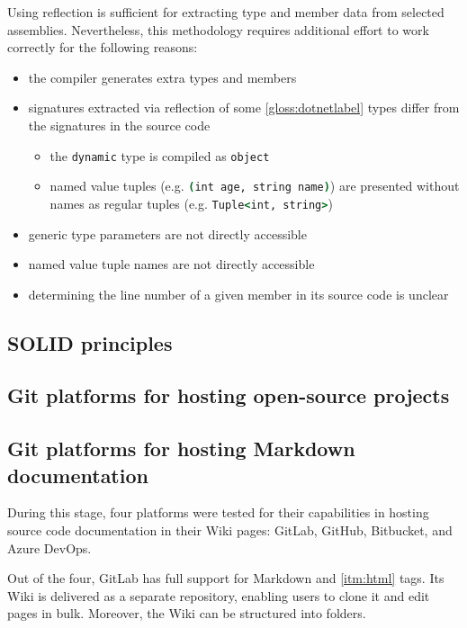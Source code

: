 Using reflection is sufficient for extracting type and member data from selected assemblies. Nevertheless, this methodology requires additional effort to work correctly for the following reasons:
\begin{itemize}
    \item the compiler generates extra types and members
    \item signatures extracted via reflection of some \ref{gloss:dotnetlabel} types differ from the signatures in the source code
    \begin{itemize}
        \item the \lstinline[language=csh]{dynamic} type is compiled as \lstinline[language=csh]{object}
        \item named value tuples (e.g. \lstinline[language=csh]{(int age, string name)}) are presented without names as regular tuples (e.g. \lstinline[language=csh]{Tuple<int, string>})
    \end{itemize}
    \item generic type parameters are not directly accessible
    \item named value tuple names are not directly accessible
    \item determining the line number of a given member in its source code is unclear
\end{itemize}

\subsection{SOLID principles}

\subsection{Git platforms for hosting open-source projects}

\subsection{Git platforms for hosting Markdown documentation}

During this stage, four platforms were tested for their capabilities in hosting source code documentation in their Wiki pages: GitLab, GitHub, Bitbucket, and Azure DevOps.

Out of the four, GitLab has full support for Markdown and \ref{itm:html} tags. Its Wiki is delivered as a separate repository, enabling users to clone it and edit pages in bulk. Moreover, the Wiki can be structured into folders.

